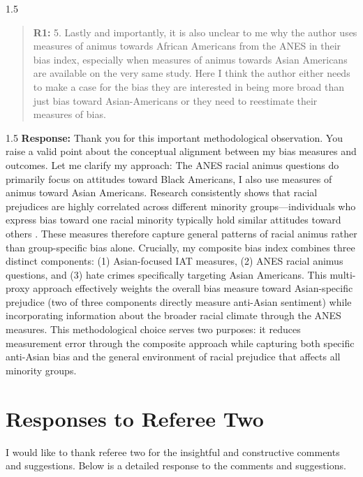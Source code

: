 \documentclass[12pt,english]{article}
\newcommand{\rrxspc}{1.5}
\begin{document}
\begin{refsection}
    \begin{spacing}{\rrxspc}
        \begin{quotation}
            \textbf{R1: } 5. Lastly and importantly, it is also unclear to me why the author uses measures of animus towards African Americans from the ANES in their bias index, especially when measures of animus towards Asian Americans are available on the very same study. Here I think the author either needs to make a case for the bias they are interested in being more broad than just bias toward Asian-Americans or they need to reestimate their measures of bias.
        \end{quotation}
    \end{spacing}

    \begin{spacing}{\rrxspc}
       \textbf{Response:} Thank you for this important methodological observation. You raise a valid point about the conceptual alignment between my bias measures and outcomes. Let me clarify my approach: The ANES racial animus questions do primarily focus on attitudes toward Black Americans, I also use measures of animus toward Asian Americans. Research consistently shows that racial prejudices are highly correlated across different minority groups—individuals who express bias toward one racial minority typically hold similar attitudes toward others \autocite{almasalkhi2023links, mora2020antiblackness}. These measures therefore capture general patterns of racial animus rather than group-specific bias alone. Crucially, my composite bias index combines three distinct components: (1) Asian-focused IAT measures, (2) ANES racial animus questions, and (3) hate crimes specifically targeting Asian Americans. This multi-proxy approach effectively weights the overall bias measure toward Asian-specific prejudice (two of three components directly measure anti-Asian sentiment) while incorporating information about the broader racial climate through the ANES measures. This methodological choice serves two purposes: it reduces measurement error through the composite approach while capturing both specific anti-Asian bias and the general environment of racial prejudice that affects all minority groups. 
    \end{spacing}
    \clearpage
    \pagebreak

    \section{Responses to Referee Two}
    I would like to thank referee two for the insightful and constructive comments and suggestions. Below is a detailed response to the comments and suggestions.


\end{refsection}
\end{document}
